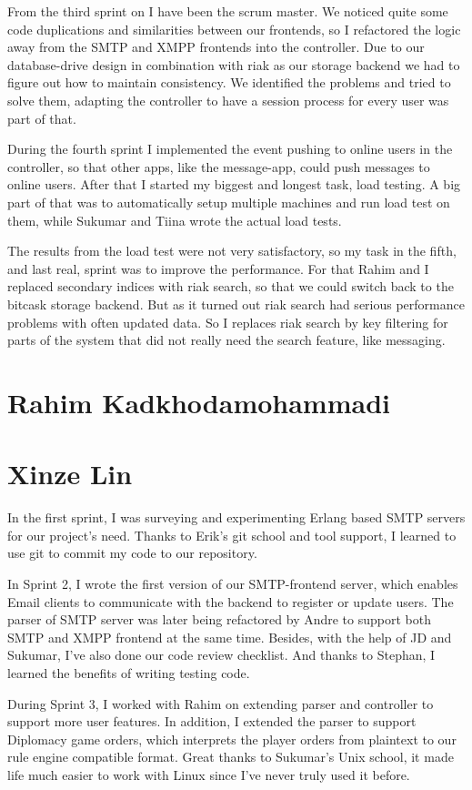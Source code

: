 \documentclass[11pt,a4paper]{report}
\begin{document}
From the third sprint on I have been the scrum master.
We noticed quite some code duplications and similarities between our frontends,
so I refactored the logic away from the SMTP and XMPP frontends into the controller.
Due to our database-drive design in combination with riak as our storage backend
we had to figure out how to maintain consistency.
We identified the problems and tried to solve them, adapting the controller to have a
session process for every user was part of that.

During the fourth sprint I implemented the event pushing to online users in the controller,
so that other apps, like the message-app, could push messages to online users.
After that I started my biggest and longest task, load testing.
A big part of that was to automatically setup multiple machines and run load test on them,
while Sukumar and Tiina wrote the actual load tests.

The results from the load test were not very satisfactory, so my task in the fifth, and last real,
sprint was to improve the performance.
For that Rahim and I replaced secondary indices with riak search, so that we could switch back to the bitcask storage backend.
But as it turned out riak search had serious performance problems with often updated data.
So I replaces riak search by key filtering for parts of the system that did not really need the search feature,
like messaging.

\section{Rahim Kadkhodamohammadi}
\section{Xinze Lin}
In the first sprint, I was surveying and experimenting Erlang based SMTP servers for our project's need.
Thanks to Erik's git school and tool support, I learned to use git to commit my code to our repository.

In Sprint 2, I wrote the first version of our SMTP-frontend server,
which enables Email clients to communicate with the backend to register or update users.
The parser of SMTP server was later being refactored by Andre to support both SMTP and XMPP frontend at the same time.
Besides, with the help of JD and Sukumar, I've also done our code review checklist.
And thanks to Stephan, I learned the benefits of writing testing code.

During Sprint 3, I worked with Rahim on extending parser and controller to support more user features.
In addition, I extended the parser to support Diplomacy game orders,
which interprets the player orders from plaintext to our rule engine compatible format.
Great thanks to Sukumar's Unix school,
it made life much easier to work with Linux since I've never truly used it before.
\end{document}

